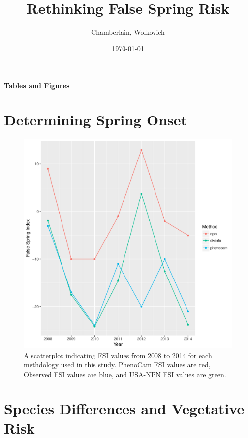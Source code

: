 \documentclass{article}\usepackage[]{graphicx}\usepackage[]{color}
\makeatletter
\def\maxwidth{ %
  \ifdim\Gin@nat@width>\linewidth
    \linewidth
  \else
    \Gin@nat@width
  \fi
}
\makeatother
\begin{document}
\title{Rethinking False Spring Risk}
\author{Chamberlain, Wolkovich}
\date{\today}
\maketitle 

\renewcommand{\thetable}{\arabic{table}}
\renewcommand{\thefigure}{\arabic{figure}}
\renewcommand{\labelitemi}{$-$}
\begin{center}
\LARGE\textbf{Tables and Figures}
\end{center}
\section{Determining Spring Onset}
\begin{figure}[H]
\includegraphics[width=\maxwidth]{figure/fsifig-1} \caption[A scatterplot indicating FSI values from 2008 to 2014 for each methdology used in this study]{A scatterplot indicating FSI values from 2008 to 2014 for each methdology used in this study. PhenoCam FSI values are red, Observed FSI values are blue, and USA-NPN FSI values are green.}\label{fig:fsifig}
\end{figure}



\section*{Species Differences and Vegetative Risk}
\end{document}
